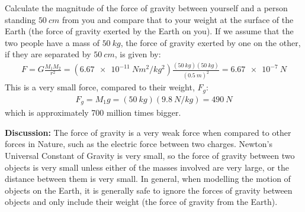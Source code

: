 \begin{example}{Calculate the magnitude of the force of gravity between yourself and a person standing $\SI{50}{cm}$ from you and compare that to your weight at the surface of the Earth (the force of gravity exerted by the Earth on you).}
If we assume that the two people have a mass of $\SI{50}{kg}$, the force of gravity exerted by one on the other, if they are separated by $\SI{50}{cm}$, is given by:
\begin{align*}
F=G\frac{M_1M_2}{r^2}=(\SI{6.67e-11}{Nm^2/kg^2})\frac{(\SI{50}{kg})(\SI{50}{kg})}{(\SI{0.5}{m})^2}=\SI{6.67e-7}{N}
\end{align*}
This is a very small force, compared to their weight, $F_g$:
\begin{align*}
F_g=M_1g=(\SI{50}{kg})(\SI{9.8}{N/kg})=\SI{490}{N}
\end{align*}
which is approximately 700 million times bigger. 

\textbf{Discussion:} The force of gravity is a very weak force when compared to other forces in Nature, such as the electric force between two charges. Newton's Universal Constant of Gravity is very small, so the force of gravity between two objects is very small unless either of the masses involved are very large, or the distance between them is very small. In general, when modelling the motion of objects on the Earth, it is generally safe to ignore the forces of gravity between objects and only include their weight (the force of gravity from the Earth). 
\end{example}

